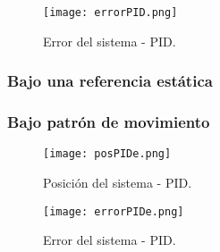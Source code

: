 \begin{figure}[htb]
    \centering
    \texttt{[image: errorPID.png]}
    \caption{Error del sistema - PID.}
    \label{fig:PID error}
\end{figure}

\subsubsection{Bajo una referencia estática}

\subsubsection{Bajo patrón de movimiento}

\begin{figure}[htb]
    \centering
    \texttt{[image: posPIDe.png]}
    \caption{Posición del sistema - PID.}
    \label{fig:PID position}
\end{figure}

\begin{figure}[htb]
    \centering
    \texttt{[image: errorPIDe.png]}
    \caption{Error del sistema - PID.}
    \label{fig:PID error}
\end{figure}